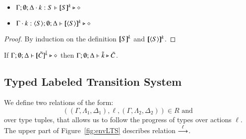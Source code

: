 \begin{proposition}\rm
$ $
	\begin{itemize}
		\item	$\Gamma; \emptyset; \Delta \cdot k:S \vdash [\!\![S]\!\!]^k \triangleright \diamond$
		\item	$\Gamma \cdot k:\langle S \rangle; \emptyset; \Delta \vdash [\!\![\langle S \rangle]\!\!]^k \triangleright \diamond$
	\end{itemize}
\end{proposition}

\begin{proof}
	By induction on the definition $[\!\![S]\!\!]^k$ and $[\!\![\langle S \rangle]\!\!]^k$.
\end{proof}

\begin{corollary}\rm
	If $\Gamma; \emptyset; \Delta \vdash [\!\![\tilde{C}]\!\!]^{\tilde{k}} \triangleright \diamond$
	then
	$\Gamma; \emptyset; \Delta \vdash \tilde{k} \triangleright \tilde{C}$.
\end{corollary}


\subsection{Typed Labeled Transition System}



We define two relations of the form:
%
\[
	((\Gamma, \Lambda_1, \Delta_1), \ell, (\Gamma, \Lambda_2, \Delta_2)) \in R \textrm{ and }
\]
%
\noi over type tuples, that allows us to follow the progress of types over actions $\ell$.
The upper part of Figure~\ref{fig:envLTS} describes relation $\stackrel{\ell}{\longrightarrow}$.


